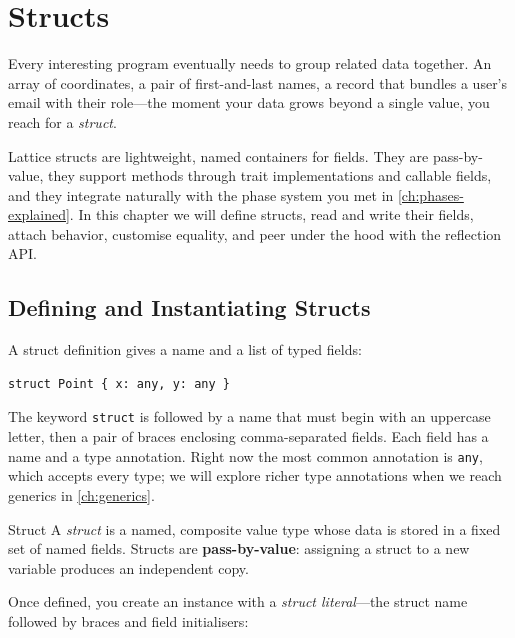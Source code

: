 \chapter{Structs}\label{ch:structs}

Every interesting program eventually needs to group related data together.
An array of coordinates, a pair of first-and-last names, a record that bundles
a user's email with their role---the moment your data grows beyond a single
value, you reach for a \emph{struct}.

Lattice structs are lightweight, named containers for fields. They are
pass-by-value, they support methods through trait implementations and callable
fields, and they integrate naturally with the phase system you met in
\cref{ch:phases-explained}. In this chapter we will define structs, read and
write their fields, attach behavior, customise equality, and peer under the
hood with the reflection API.

\section{Defining and Instantiating Structs}\label{sec:struct-defining}

A struct definition gives a name and a list of typed fields:

\begin{lstlisting}[language=Lattice, caption={A minimal struct definition}]
struct Point { x: any, y: any }
\end{lstlisting}

The keyword \lstinline|struct| is followed by a name that must begin with an
uppercase letter, then a pair of braces enclosing comma-separated fields.
Each field has a name and a type annotation. Right now the most common
annotation is \lstinline|any|, which accepts every type; we will explore
richer type annotations when we reach generics in \cref{ch:generics}.

\begin{defnbox}{Struct}
A \emph{struct} is a named, composite value type whose data is stored in
a fixed set of named fields. Structs are \textbf{pass-by-value}: assigning
a struct to a new variable produces an independent copy.
\end{defnbox}

Once defined, you create an instance with a \emph{struct literal}---the struct
name followed by braces and field initialisers:

